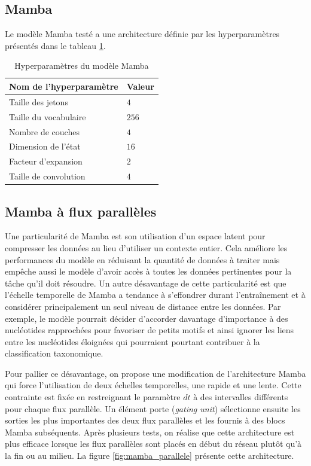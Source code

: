 \subsection{Mamba}
Le modèle Mamba testé a une architecture définie par les hyperparamètres présentés dans le tableau
\ref{tableau:mamba_hyperparametre}.

\begin{table}[hbt!]
    \centering
    \begin{tabular}{ll}
\hline
Nom de l'hyperparamètre & Valeur \\
\hline
Taille des jetons & $4$ \\
Taille du vocabulaire & $256$ \\
Nombre de couches & $4$ \\
Dimension de l'état & $16$ \\
Facteur d'expansion & $2$ \\
Taille de convolution & $4$ \\
\hline
    \end{tabular}
    \caption{Hyperparamètres du modèle Mamba}
    \label{tableau:mamba_hyperparametre}
\end{table}

\subsection{Mamba à flux parallèles}
Une particularité de Mamba est son utilisation d'un espace latent pour compresser les données au
lieu d'utiliser un contexte entier. Cela améliore les performances du modèle en réduisant la
quantité de données à traiter mais empêche aussi le modèle d'avoir accès à toutes les données
pertinentes pour la tâche qu'il doit résoudre. Un autre désavantage de cette particularité est que
l'échelle temporelle de Mamba a tendance à s'effondrer durant l'entraînement et à considérer
principalement un seul niveau de distance entre les données. Par exemple, le modèle pourrait décider
d'accorder davantage d'importance à des nucléotides rapprochées pour favoriser de petits motifs et
ainsi ignorer les liens entre les nucléotides éloignées qui pourraient pourtant contribuer à la
classification taxonomique.

Pour pallier ce désavantage, on propose une modification de l'architecture Mamba qui force
l'utilisation de deux échelles temporelles, une rapide et une lente. Cette contrainte est fixée en
restreignant le paramètre $dt$ à des intervalles différents pour chaque flux parallèle. Un élément
porte (\textit{gating unit}) sélectionne ensuite les sorties les plus importantes des deux flux
parallèles et les fournis à des blocs Mamba subséquents. Après plusieurs tests, on réalise que cette
architecture est plus efficace lorsque les flux parallèles sont placés en début du réseau plutôt
qu'à la fin ou au milieu. La figure \ref{fig:mamba_parallele} présente cette architecture.

